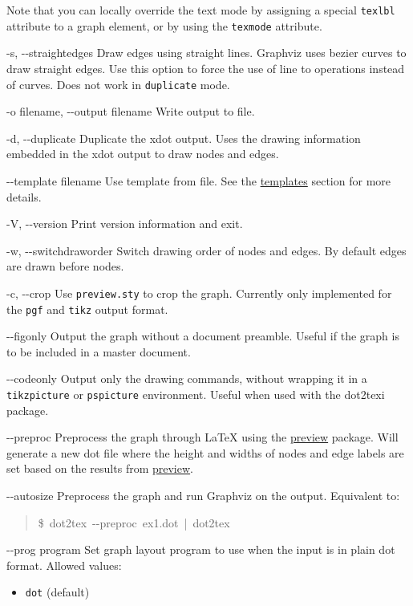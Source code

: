 \documentclass[10pt,a4paper,english]{article}
\newcommand{\optionlistlabel}[1]{\bf #1 \hfill}
\newenvironment{optionlist}[1]
{\begin{list}{}
  {\setlength{\labelwidth}{#1}
   \setlength{\rightmargin}{1cm}
   \setlength{\leftmargin}{\rightmargin}
   \addtolength{\leftmargin}{\labelwidth}
   \addtolength{\leftmargin}{\labelsep}
   \renewcommand{\makelabel}{\optionlistlabel}}
}{\end{list}}
\begin{document}
\begin{optionlist}{3cm}
Note that you can locally override the text mode by assigning a special \texttt{texlbl} attribute to a graph element, or by using the \texttt{texmode} attribute.
\item [-s, -{}-straightedges]  
Draw edges using straight lines. Graphviz uses bezier curves to draw straight edges. Use this option to force the use of line to operations instead of curves. Does not work in \texttt{duplicate} mode.
\item [-o filename, -{}-output filename]  
Write output to file.
\item [-d, -{}-duplicate]  
Duplicate the xdot output. Uses the drawing information embedded in the xdot output to draw nodes and edges.
\item [-{}-template filename]  
Use template from file. See the \href{\#templates}{templates} section for more details.
\item [-V, -{}-version]  
Print version information and exit.
\item [-w, -{}-switchdraworder]  
Switch drawing order of nodes and edges. By default edges are drawn before nodes.
\item [-c, -{}-crop]  
Use \texttt{preview.sty} to crop the graph. Currently only implemented for the \texttt{pgf} and \texttt{tikz} output format.
\item [-{}-figonly]  
Output the graph without a document preamble. Useful if the graph is to be included in a master document.
\item [-{}-codeonly]  
Output only the drawing commands, without wrapping it in a \texttt{tikzpicture} or \texttt{pspicture} environment. Useful when used with the dot2texi package.
\item [-{}-preproc]  
Preprocess the graph through LaTeX using the \href{http://www.ctan.org/tex-archive/help/Catalogue/entries/preview.html}{preview} package. Will generate a new dot file where the height and widths of nodes and edge labels are set based on the results from \href{http://www.ctan.org/tex-archive/help/Catalogue/entries/preview.html}{preview}.
\item [-{}-autosize]  
Preprocess the graph and run Graphviz on the output. Equivalent to:
\begin{quote}{\ttfamily \raggedright \noindent
{\$}~dot2tex~-{}-preproc~ex1.dot~|~dot2tex
}\end{quote}
\item [-{}-prog program]  
Set graph layout program to use when the input is in plain dot format. Allowed values:
\begin{itemize}
\item {} 
\texttt{dot} (default)


\end{itemize}
\end{optionlist}
\end{document}
